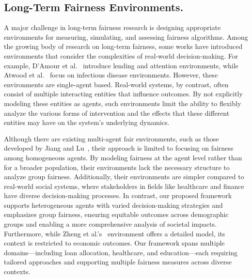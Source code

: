 \subsection{Long-Term Fairness Environments.}
A major challenge in long-term fairness research is designing appropriate environments for measuring, simulating, and assessing fairness algorithms. Among the growing body of research on long-term fairness, some works have introduced environments that consider the complexities of real-world decision-making. For example, D’Amour et al.~\cite{d2020fairness} introduce lending and attention environments, while Atwood et al.~\cite{atwood2019fair} focus on infectious disease environments. However, these environments are single-agent based. Real-world systems, by contrast, often consist of multiple interacting entities that influence outcomes. By not explicitly modeling these entities as agents, such environments limit the ability to flexibly analyze the various forms of intervention and the effects that these different entities may have on the system’s underlying dynamics.

Although there are existing multi-agent fair environments, such as those developed by Jiang and Lu~\cite{jiang2019learning}, their approach is limited to focusing on fairness among homogeneous agents. By modeling fairness at the agent level rather than for a broader population, their environments lack the necessary structure to analyze group fairness. Additionally, their environments are simpler compared to real-world social systems, where stakeholders in fields like healthcare and finance have diverse decision-making processes. In contrast, our proposed framework supports heterogeneous agents with varied decision-making strategies and emphasizes group fairness, ensuring equitable outcomes across demographic groups and enabling a more comprehensive analysis of societal impacts. Furthermore, while Zheng et al.’s~\cite{zheng2022ai} environment offers a detailed model, its context is restricted to economic outcomes. Our framework spans multiple domains---including loan allocation, healthcare, and education---each requiring tailored approaches and supporting multiple fairness measures across diverse contexts.
